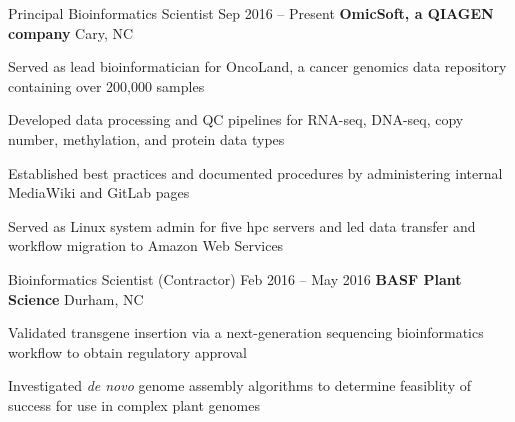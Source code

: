 
\begin{resentries}

  \resentry
    {Principal Bioinformatics Scientist}
    {Sep 2016 -- Present}
    {\textbf{OmicSoft, a QIAGEN company}} %
    {Cary, NC} %
    {
      \begin{cvitems} %
        \item{Served as lead bioinformatician for OncoLand, a cancer genomics data repository containing over 200,000 samples}
        \item{Developed data processing and QC pipelines for RNA-seq, DNA-seq, copy number, methylation, and protein data types} 
        \item{Established best practices and documented procedures by administering internal MediaWiki and GitLab pages}
        \item{Served as Linux system admin for five hpc servers and led data transfer and workflow migration to Amazon Web Services}
      \end{cvitems}
    }

  \resentry
    {Bioinformatics Scientist (Contractor)}
    {Feb 2016 -- May 2016}
    {\textbf{BASF Plant Science}}
    {Durham, NC}
    {
      \begin{cvitems} %
        \item{Validated transgene insertion via a next-generation sequencing bioinformatics workflow to obtain regulatory approval}
        \item{Investigated \textit{de novo} genome assembly algorithms to determine feasiblity of success for use in complex plant genomes}
      \end{cvitems}
    }

\end{resentries}
\vspace{-2mm}
